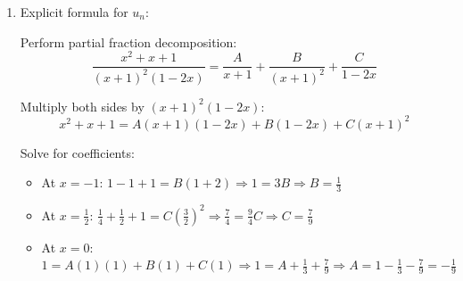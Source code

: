 \documentclass[12pt]{article}
\begin{document}
\begin{answerbox}
\begin{enumerate}
    Simplify numerator and denominator:
    \[
    1 - x + \frac{x^2}{1+x} = \frac{(1-x)(1+x) + x^2}{1+x} = \frac{1 - x^2 + x^2}{1+x} = \frac{1}{1+x}
    \]
    
    And $1 - x - 2x^2 = (1+x)(1-2x)$.
    
    Therefore:
    \[
    f(x) = \frac{\frac{1}{1+x}}{(1+x)(1-2x)} = \frac{1}{(1+x)^2(1-2x)}
    \]
    
    But wait, the problem statement says $f(x) = \frac{x^2 + x + 1}{(x+1)^2(1-2x)}$. Let me check the numerator again:
    
    Actually: $1 - x + \frac{x^2}{1+x} = \frac{(1-x)(1+x) + x^2}{1+x} = \frac{1 - x^2 + x^2}{1+x} = \frac{1}{1+x}$. But $u_0 = 1, u_1 = 1$, so $f(x) = 1 + x + \sum_{n=2}^\infty u_n x^n$.
    
    I should have: $f(x) - 1 - x = \sum_{n=2}^\infty u_n x^n = \sum_{n=0}^\infty u_{n+2} x^{n+2}$.
    
    So the equation becomes:
    \[
    f(x) - 1 - x = x(f(x) - 1) + 2x^2 f(x) + \frac{x^2}{1+x}
    \]
    
    Solving:
    \begin{align*}
    f(x) - xf(x) - 2x^2 f(x) &= 1 + x - x + \frac{x^2}{1+x} \\
    f(x) &= \frac{1+x+x^2}{(1+x)(1 - x - 2x^2)}
    \end{align*}
    
    Since $1 - x - 2x^2 = (1+x)(1-2x)$, we get:
    \[
    f(x) = \frac{x^2 + x + 1}{(x+1)^2(1-2x)}
    \]
    which matches the problem statement.
    
    \item Explicit formula for $u_n$:
    
    Perform partial fraction decomposition:
    \[
    \frac{x^2 + x + 1}{(x+1)^2(1-2x)} = \frac{A}{x+1} + \frac{B}{(x+1)^2} + \frac{C}{1-2x}
    \]
    
    Multiply both sides by $(x+1)^2(1-2x)$:
    \[
    x^2 + x + 1 = A(x+1)(1-2x) + B(1-2x) + C(x+1)^2
    \]
    
    Solve for coefficients:
    \begin{itemize}
        \item At $x = -1$: $1 - 1 + 1 = B(1+2) \Rightarrow 1 = 3B \Rightarrow B = \frac{1}{3}$
        \item At $x = \frac{1}{2}$: $\frac{1}{4} + \frac{1}{2} + 1 = C\left(\frac{3}{2}\right)^2 \Rightarrow \frac{7}{4} = \frac{9}{4}C \Rightarrow C = \frac{7}{9}$
        \item At $x = 0$: $1 = A(1)(1) + B(1) + C(1) \Rightarrow 1 = A + \frac{1}{3} + \frac{7}{9} \Rightarrow A = 1 - \frac{1}{3} - \frac{7}{9} = -\frac{1}{9}$
    \end{itemize}
    

\end{enumerate}
\end{answerbox}
\end{document}
